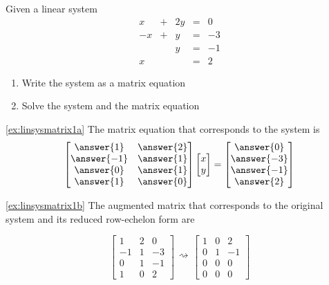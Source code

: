 \documentclass{ximera}
\begin{document}
\begin{example}\label{ex:linsysmatrixmult} Given a linear system
$$\begin{array}{ccccc}
      x& +&2y&=&0\\
      -x & +&y&= &-3\\
      & &y&=&-1\\
      x& &&=&2
    \end{array}$$
    \begin{enumerate}
    \item\label{ex:linsysmatrix1a}
    Write the system as a matrix equation
    \item\label{ex:linsysmatrix1b}
    Solve the system and the matrix equation
    \end{enumerate}
    \begin{explanation}
    \ref{ex:linsysmatrix1a} 
    The matrix equation that corresponds to the system is
    $$\begin{bmatrix}\answer{1}&\answer{2}\\\answer{-1}&\answer{1}\\\answer{0}&\answer{1}\\\answer{1}&\answer{0}\end{bmatrix}\begin{bmatrix}x\\y\end{bmatrix}=\begin{bmatrix}\answer{0}\\\answer{-3}\\\answer{-1}\\\answer{2}\end{bmatrix}$$
    
    \ref{ex:linsysmatrix1b}
    The augmented matrix that corresponds to the original system and its reduced row-echelon form are
    
    $$\left[\begin{array}{cc|c}  
 1&2&0\\-1&1&-3\\0&1&-1\\1&0&2
 \end{array}\right]\begin{array}{c}
 \\
 \rightsquigarrow\\
 \\
 \end{array}\left[\begin{array}{cc|c}  
 1&0&2\\0&1&-1\\0&0&0\\0&0&0
 \end{array}\right]$$
 

\end{explanation}
\end{example}
\end{document}
